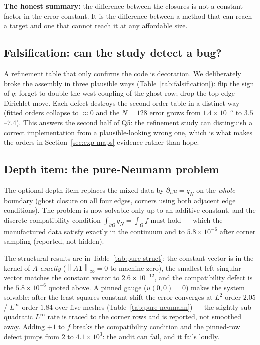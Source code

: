\documentclass[11pt,a4paper]{article}
\newcommand{\vect}[1]{\mathbf{#1}}
\newcommand{\norm}[1]{\left\lVert #1 \right\rVert}
\begin{document}
\textbf{The honest summary:} the difference between the closures is not a
constant factor in the error constant. It is the difference between a
method that can reach a target and one that cannot reach it at any
affordable size.

\subsection{Falsification: can the study detect a bug?}
\label{sec:falsif}

A refinement table that only confirms the code is decoration. We
deliberately broke the assembly in three plausible ways
(Table~\ref{tab:falsification}): flip the sign of $q$; forget to double the
west coupling of the ghost row; drop the top-edge Dirichlet move. Each
defect destroys the second-order table in a distinct way (fitted orders
collapse to $\approx 0$ and the $N = 128$ error grows from
$1.4\times10^{-5}$ to $3.5$--$7.4$). This answers the second half of Q5:
the refinement study can distinguish a correct implementation from a
plausible-looking wrong one, which is what makes the orders in
Section~\ref{sec:exp-maps} evidence rather than hope.



\subsection{Depth item: the pure-Neumann problem}
\label{sec:pure}

The optional depth item replaces the mixed data by $\partial_n u = q_N$ on
the \emph{whole} boundary (ghost closure on all four edges, corners using
both adjacent edge conditions). The problem is now solvable only up to an
additive constant, and the discrete compatibility condition
$\int_{\partial\Omega} q_N = \int_\Omega f$ must hold --- which the
manufactured data satisfy exactly in the continuum and to
$5.8\times10^{-6}$ after corner sampling (reported, not hidden).



The structural results are in Table~\ref{tab:pure-struct}: the constant
vector is in the kernel of $A$ \emph{exactly}
($\norm{A\vect{1}}_\infty = 0$ to machine zero), the smallest left singular
vector matches the constant vector to $2.6\times10^{-12}$, and the
compatibility defect is the $5.8\times10^{-6}$ quoted above. A pinned gauge
($u(0,0) = 0$) makes the system solvable; after the least-squares constant
shift the error converges at $L^2$ order $2.05$ / $L^\infty$ order $1.84$
over five meshes (Table~\ref{tab:pure-neumann}) --- the slightly
sub-quadratic $L^\infty$ rate is traced to the corner rows and is reported,
not smoothed away. Adding $+1$ to $f$ breaks the compatibility condition
and the pinned-row defect jumps from $2$ to $4.1\times10^3$: the audit can
fail, and it fails loudly.
\end{document}
